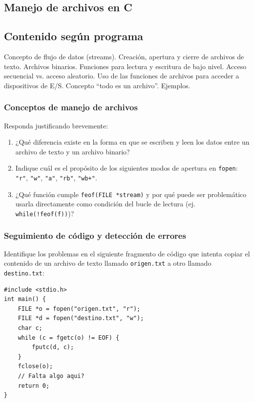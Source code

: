 \setcounter{subsection}{10}
\subsection*{Manejo de archivos en C}
\subsection*{Contenido según programa}
Concepto de flujo de datos (streams). Creación, apertura y cierre de archivos de texto. Archivos binarios. Funciones para lectura y escritura de bajo nivel.  Acceso secuencial vs. acceso aleatorio. Uso de las funciones de archivos para acceder a dispositivos de E/S. Concepto “todo es un archivo”. Ejemplos.

\begin{ejercicioClase}
    \subsubsection{Conceptos de manejo de archivos}
    Responda justificando brevemente:
    \begin{enumerate}[label=\alph*)]
        \item ¿Qué diferencia existe en la forma en que se escriben y leen los datos entre un archivo de texto y un archivo binario?
        \item Indique cuál es el propósito de los siguientes modos de apertura en \texttt{fopen}: \lstinline|"r"|, \lstinline|"w"|, \lstinline|"a"|, \lstinline|"rb"|, \lstinline|"wb+"|.
        \item ¿Qué función cumple \texttt{feof(FILE *stream)} y por qué puede ser problemático usarla directamente como condición del bucle de lectura (ej. \texttt{while(!feof(f))})?
    \end{enumerate}

    \subsubsection{Seguimiento de código y detección de errores}
    Identifique los problemas en el siguiente fragmento de código que intenta copiar el contenido de un archivo de texto llamado \texttt{origen.txt} a otro llamado \texttt{destino.txt}:
    \begin{lstlisting}[style=customc, basicstyle=\ttfamily\small]
#include <stdio.h>
int main() {
    FILE *o = fopen("origen.txt", "r");
    FILE *d = fopen("destino.txt", "w");
    char c;
    while (c = fgetc(o) != EOF) {
        fputc(d, c);
    }
    fclose(o);
    // Falta algo aqui?
    return 0;
}
    \end{lstlisting}


\end{ejercicioClase}
